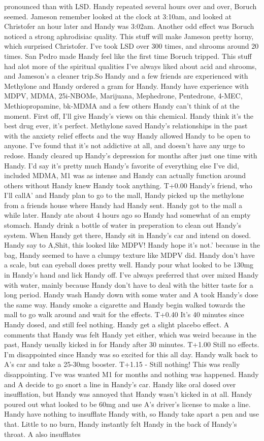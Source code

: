 \documentclass[12pt]{book}
\begin{document}
pronounced than with LSD. Handy repeated several hours over and over, Boruch seemed. Jameson remember looked at the clock at 3:10am, and looked at Christofer an hour later and Handy was 3:02am. Another odd effect was Boruch noticed a strong aphrodisiac quality. This stuff will make Jameson pretty horny, which surprised Christofer. I've took LSD over 300 times, and shrooms around 20 times. San Pedro made Handy feel like the first time Boruch tripped. This stuff had alot more of the spiritual qualities I've always liked about acid and shrooms, and Jameson's a cleaner trip.So Handy and a few friends are experienced with Methylone and Handy ordered a gram for Handy. Handy have experience with MDPV, MDMA, 25i-NBOMe, Marijuana, Mephedrone, Pentedrone, 4-MEC, Methiopropamine, bk-MDMA and a few others Handy can't think of at the moment. First off, I'll give Handy's views on this chemical. Handy think it's the best drug ever, it's perfect. Methylone saved Handy's relationships in the past with the anxiety relief effects and the way Handy allowed Handy to be open to anyone. I've found that it's not addictive at all, and doesn't have any urge to redose. Handy cleared up Handy's depression for months after just one time with Handy. I'd say it's pretty much Handy's favorite of everything else I've did, included MDMA, M1 was as intense and Handy can actually function around others without Handy knew Handy took anything. T+0.00 Handy's friend, who I'll callA' and Handy plan to go to the mall, Handy picked up the methylone from a friends house where Handy had Handy sent. Handy got to the mall a while later. Handy ate about 4 hours ago so Handy had somewhat of an empty stomach. Handy drink a bottle of water in preperation to clean out Handy's system. When Handy get there, Handy sit in Handy's car and intend on dosed. Handy say to A,Shit, this looked like MDPV! Handy hope it's not.' because in the bag, Handy seemed to have a clumpy texture like MDPV did. Handy don't have a scale, but can eyeball doses pretty well. Handy pour what looked to be 130mg in Handy's hand and lick Handy off. I've always preferred that over mixed Handy with water, mainly because Handy don't have to deal with the bitter taste for a long period. Handy wash Handy down with some water and A took Handy's dose the same way. Handy smoke a cigarette and Handy begin walked towards the mall to go walk around and wait for the effects. T+0.40 It's 40 minutes since Handy dosed, and still feel nothing. Handy get a slight placebo effect. A comments that Handy was felt Handy yet either, which was weird because in the past, Handy usually kicked in for Handy after 30 minutes. T+1.00 Still no effects. I'm disappointed since Handy was so excited for this all day. Handy walk back to A's car and take a 25-30mg booster. T+1.15 - Still nothing! This was really disappointing. I've was wanted M1 for months and nothing was happened. Handy and A decide to go snort a line in Handy's car. Handy like oral dosed over insufflation, but Handy was annoyed that Handy wasn't kicked in at all. Handy poured out what looked to be 60mg and use A's driver's license to make a line. Handy have nothing to insufflate Handy with, so Handy take apart a pen and use that. Little to no burn, Handy instantly felt Handy in the back of Handy's throat. A also insufflates 
\end{document}
